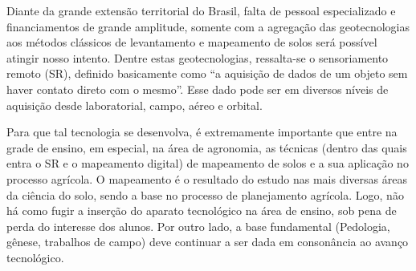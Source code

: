 Diante da grande extensão territorial do Brasil, falta de pessoal especializado e financiamentos de grande amplitude, somente com a agregação das geotecnologias aos métodos clássicos de levantamento e mapeamento de solos será possível atingir nosso intento. Dentre estas geotecnologias, ressalta-se o sensoriamento remoto (SR), definido basicamente como ``a aquisição de dados de um objeto sem haver contato direto com o mesmo''. Esse dado pode ser em diversos níveis de aquisição desde laboratorial, campo, aéreo e orbital. 

Para que tal tecnologia se desenvolva, é extremamente importante que entre na grade de ensino, em especial, na área de agronomia, as técnicas (dentro das quais entra o SR e o mapeamento digital) de mapeamento de solos e a sua aplicação no processo agrícola. O mapeamento é o resultado do estudo nas mais diversas áreas da ciência do solo, sendo a base no processo de planejamento agrícola. Logo, não há como fugir a inserção do aparato tecnológico na área de ensino, sob pena de perda do interesse dos alunos. Por outro lado, a base fundamental (Pedologia, gênese, trabalhos de campo) deve continuar a ser dada em consonância ao avanço tecnológico. 

